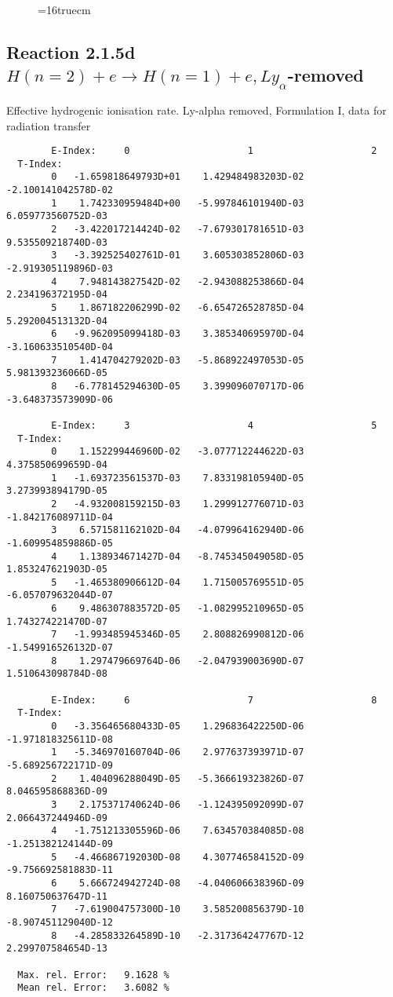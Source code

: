 \documentclass[12pt]{article}
\begin{document}
\begin{figure} \label{2.1.5c}
\epsfxsize=16truecm
\end{figure}
\newpage
\subsection{
Reaction 2.1.5d  $H(n=2) + e \rightarrow H(n=1) + e, Ly_\alpha$-removed}


   Effective hydrogenic ionisation rate. 
   Ly-alpha removed, Formulation I, data for radiation transfer

\begin{small}\begin{verbatim}
        E-Index:     0                     1                     2
  T-Index:
        0   -1.659818649793D+01    1.429484983203D-02   -2.100141042578D-02
        1    1.742330959484D+00   -5.997846101940D-03    6.059773560752D-03
        2   -3.422017214424D-02   -7.679301781651D-03    9.535509218740D-03
        3   -3.392525402761D-01    3.605303852806D-03   -2.919305119896D-03
        4    7.948143827542D-02   -2.943088253866D-04    2.234196372195D-04
        5    1.867182206299D-02   -6.654726528785D-04    5.292004513132D-04
        6   -9.962095099418D-03    3.385340695970D-04   -3.160633510540D-04
        7    1.414704279202D-03   -5.868922497053D-05    5.981393236066D-05
        8   -6.778145294630D-05    3.399096070717D-06   -3.648373573909D-06

        E-Index:     3                     4                     5
  T-Index:
        0    1.152299446960D-02   -3.077712244622D-03    4.375850699659D-04
        1   -1.693723561537D-03    7.833198105940D-05    3.273993894179D-05
        2   -4.932008159215D-03    1.299912776071D-03   -1.842176089711D-04
        3    6.571581162102D-04   -4.079964162940D-06   -1.609954859886D-05
        4    1.138934671427D-04   -8.745345049058D-05    1.853247621903D-05
        5   -1.465380906612D-04    1.715005769551D-05   -6.057079632044D-07
        6    9.486307883572D-05   -1.082995210965D-05    1.743274221470D-07
        7   -1.993485945346D-05    2.808826990812D-06   -1.549916526132D-07
        8    1.297479669764D-06   -2.047939003690D-07    1.510643098784D-08

        E-Index:     6                     7                     8
  T-Index:
        0   -3.356465680433D-05    1.296836422250D-06   -1.971818325611D-08
        1   -5.346970160704D-06    2.977637393971D-07   -5.689256722171D-09
        2    1.404096288049D-05   -5.366619323826D-07    8.046595868836D-09
        3    2.175371740624D-06   -1.124395092099D-07    2.066437244946D-09
        4   -1.751213305596D-06    7.634570384085D-08   -1.251382124144D-09
        5   -4.466867192030D-08    4.307746584152D-09   -9.756692581883D-11
        6    5.666724942724D-08   -4.040606638396D-09    8.160750637647D-11
        7   -7.619004757300D-10    3.585200856379D-10   -8.907451129040D-12
        8   -4.285833264589D-10   -2.317364247767D-12    2.299707584654D-13

  Max. rel. Error:   9.1628 %
  Mean rel. Error:   3.6082 %


\end{verbatim}\end{small}
\end{document}
